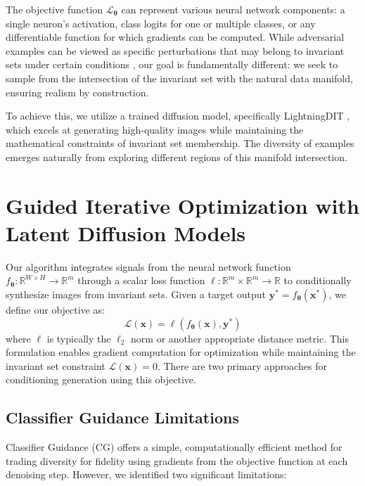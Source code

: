 \documentclass[licencjacka,en]{pracamgr}
\begin{document}
The objective function $\mathcal{L}_{\boldsymbol{\theta}}$ can represent various neural network components: a single neuron's activation, class logits for one or multiple classes, or any differentiable function for which gradients can be computed. While adversarial examples can be viewed as specific perturbations that may belong to invariant sets under certain conditions \cite{szegedy2014intriguingpropertiesneuralnetworks}, our goal is fundamentally different: we seek to sample from the intersection of the invariant set with the natural data manifold, ensuring realism by construction.

To achieve this, we utilize a trained diffusion model, specifically LightningDIT \cite{yao2025vavae} \cite{yao2024fasterdit}, which excels at generating high-quality images while maintaining the mathematical constraints of invariant set membership. The diversity of examples emerges naturally from exploring different regions of this manifold intersection.


\section{Guided Iterative Optimization with Latent Diffusion Models}

Our algorithm integrates signals from the neural network function $f_{\boldsymbol{\theta}}:\mathbb{R}^{W \times H} \rightarrow \mathbb{R}^m$ through a scalar loss function $\ell: \mathbb{R}^m \times \mathbb{R}^m \rightarrow \mathbb{R}$ to conditionally synthesize images from invariant sets. Given a target output $\mathbf{y^*} = f_{\boldsymbol{\theta}}(\mathbf{x^*})$, we define our objective as:
\begin{equation}
\mathcal{L}(\mathbf{x}) = \ell(f_{\boldsymbol{\theta}}(\mathbf{x}), \mathbf{y^*})
\end{equation}
where $\ell$ is typically the $\ell_2$ norm or another appropriate distance metric. This formulation enables gradient computation for optimization while maintaining the invariant set constraint $\mathcal{L}(\mathbf{x}) = 0$. There are two primary approaches for conditioning generation using this objective.

\subsection{Classifier Guidance Limitations}

Classifier Guidance (CG) \cite{dhariwal2021diffusionmodelsbeatgans} offers a simple, computationally efficient method for trading diversity for fidelity using gradients from the objective function at each denoising step. However, we identified two significant limitations:
\end{document}
